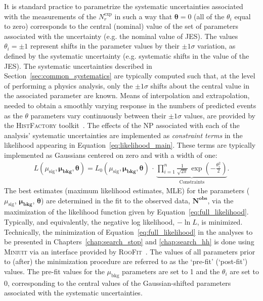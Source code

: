 It is standard practice to parametrize the systematic uncertainties associated with the measurements
of the $N_r^{\text{exp}}$ in such a way that $\bm{\theta} = 0$ (all of the $\theta_i$ equal to zero) corresponds to the central (nominal) value
of the set of parameters associated with the uncertainty (e.g. the nominal value of JES).
The values $\theta_i = \pm 1$ represent shifts in the parameter values by their $\pm 1\sigma$
variation, as defined by the systematic uncertainty (e.g. systematic shifts in the value of the JES).
The systematic uncertainties described in Section~\ref{sec:common_systematics} are typically
computed such that, at the level of performing a physics analysis, only the $\pm 1 \sigma$ shifts about the central value
in the associated parameter are known.
Means of interpolation and extrapolation, needed to obtain a smoothly varying response in the
numbers of predicted events as the $\theta$ parameters vary continuously between their $\pm 1 \sigma$ values,
are provided by the \textsc{HistFactory} toolkit~\cite{HistFactory}.
The effects of the NP associated with each of the analysis' systematic uncertainties
are implemented as \textit{constraint terms} in the likelihood appearing in Equation~\ref{eq:likelihood_main}.
These terms are typically implemented as Gaussians centered on zero and with a width of one:
\begin{align}
    L(\mu_{\text{sig}}, \bm{\mu_{\text{bkg}}}, \bm{\theta}) = L_0(\mu_{\text{sig}}, \bm{\mu_{\text{bkg}}}, \bm{\theta})
        \, \cdot \, \underbrace{\prod\limits_{i = 1}^{n} \frac{1}{\sqrt{2 \pi}} \, \exp \left( - \frac{\theta_i^2}{2} \right)}_{\text{Constraints}}.
    \label{eq:full_likelihood}
\end{align}
The best estimates (maximum likelihood estimates, MLE) for the parameters ($\mu_{\text{sig}}$, $\bm{\mu_{\text{bkg}}}$, $\bm{\theta}$)
are determined in the fit to the observed data, $\bm{N^{\text{obs}}}$, via the maximization
of the likelihood function given by Equation~\ref{eq:full_likelihood}. 
Typically, and equivalently, the negative log likelihood, $-\ln L$, is minimized.
Technically, the minimization of Equation~\ref{eq:full_likelihood} in the analyses to be presented
in Chapters~\ref{chap:search_stop} and \ref{chap:search_hh} is done using \textsc{Miniuit}
via an interface provided by \textsc{RooFit}~\cite{MINUIT,RooFitI}.
The values of all parameters prior to (after) the minimization procedure are referred to as the
`pre-fit' (`post-fit') values.
The pre-fit values for the $\mu_{\text{bkg}}$ parameters are set to 1 and the $\theta_i$ are set to $0$, corresponding
to the central values of the Gaussian-shifted parameters associated with the systematic uncertainties.

